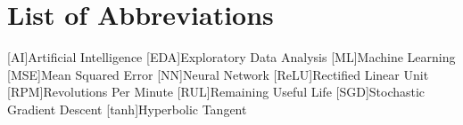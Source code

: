 \chapter*{List of Abbreviations} 

\begin{acronym}
	
	[AI]{Artificial Intelligence}
	[EDA]{Exploratory Data Analysis}
	[ML]{Machine Learning}
	[MSE]{Mean Squared Error}
	[NN]{Neural Network}
	[ReLU]{Rectified Linear Unit}
	[RPM]{Revolutions Per Minute}
	[RUL]{Remaining Useful Life}
	[SGD]{Stochastic Gradient Descent}
	[tanh]{Hyperbolic Tangent}
	
\end{acronym}
